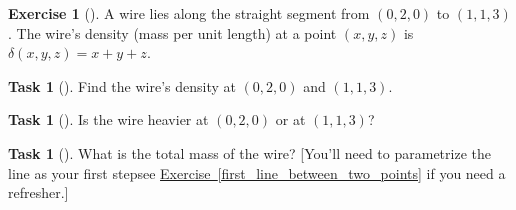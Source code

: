 \documentclass[10pt,]{book}
\theoremstyle{plain}
\theoremstyle{definition}
\theoremstyle{definition}
\theoremstyle{definition}
\theoremstyle{definition}
\newtheorem{exploration}[project]{Exercise}
\newtheorem{task}[project]{Task}
\theoremstyle{definition}
\numberwithin{equation}{section}
\begin{document}
\begin{exploration}[]\label{exploration-219}
\larsonfive{ } A wire lies along the straight segment from \((0,2,0)\) to \((1,1,3)\). The wire's density (mass per unit length) at a point \((x,y,z)\) is \(\delta(x,y,z)=x+y+z\).%
\begin{task}[]\label{task-561}
Find the wire's density at \((0,2,0)\) and \((1,1,3)\).%
\end{task}
\begin{task}[]\label{task-562}
Is the wire heavier at \((0,2,0)\) or at \((1,1,3)\)?%
\end{task}
\begin{task}[]\label{task-563}
What is the total mass of the wire?  [You'll need to parametrize the line as your first step\textemdash{}see \hyperref[first_line_between_two_points]{Exercise~\ref{first_line_between_two_points}} if you need a refresher.]%
\end{task}
\end{exploration}
\typeout{************************************************}
\typeout{************************************************}
\end{document}
